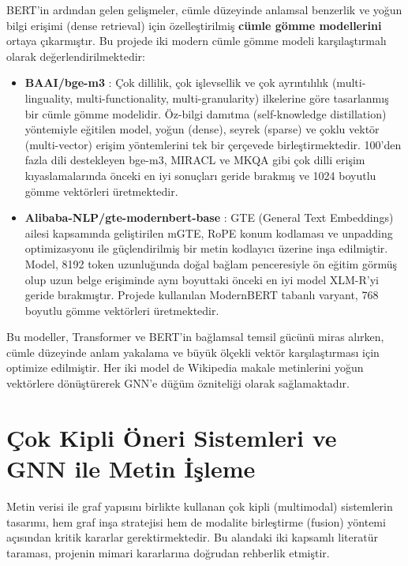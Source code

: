 BERT'in ardından gelen gelişmeler, cümle düzeyinde anlamsal benzerlik ve yoğun bilgi erişimi (dense retrieval) için özelleştirilmiş \textbf{cümle gömme modellerini} ortaya çıkarmıştır. Bu projede iki modern cümle gömme modeli karşılaştırmalı olarak değerlendirilmektedir:
\begin{itemize}
    \item \textbf{BAAI/bge-m3} \cite{chen2025bgem3}: Çok dillilik, çok işlevsellik ve çok ayrıntılılık (multi-linguality, multi-functionality, multi-granularity) ilkelerine göre tasarlanmış bir cümle gömme modelidir. Öz-bilgi damıtma (self-knowledge distillation) yöntemiyle eğitilen model, yoğun (dense), seyrek (sparse) ve çoklu vektör (multi-vector) erişim yöntemlerini tek bir çerçevede birleştirmektedir. 100'den fazla dili destekleyen bge-m3, MIRACL ve MKQA gibi çok dilli erişim kıyaslamalarında önceki en iyi sonuçları geride bırakmış ve 1024 boyutlu gömme vektörleri üretmektedir.
    \item \textbf{Alibaba-NLP/gte-modernbert-base} \cite{zhang2024mgte}: GTE (General Text Embeddings) ailesi kapsamında geliştirilen mGTE, RoPE konum kodlaması ve unpadding optimizasyonu ile güçlendirilmiş bir metin kodlayıcı üzerine inşa edilmiştir. Model, 8192 token uzunluğunda doğal bağlam penceresiyle ön eğitim görmüş olup uzun belge erişiminde aynı boyuttaki önceki en iyi model XLM-R'yi geride bırakmıştır. Projede kullanılan ModernBERT tabanlı varyant, 768 boyutlu gömme vektörleri üretmektedir.
\end{itemize}
Bu modeller, Transformer ve BERT'in bağlamsal temsil gücünü miras alırken, cümle düzeyinde anlam yakalama ve büyük ölçekli vektör karşılaştırması için optimize edilmiştir. Her iki model de Wikipedia makale metinlerini yoğun vektörlere dönüştürerek GNN'e düğüm özniteliği olarak sağlamaktadır.

\section{Çok Kipli Öneri Sistemleri ve GNN ile Metin İşleme}

Metin verisi ile graf yapısını birlikte kullanan çok kipli (multimodal) sistemlerin tasarımı, hem graf inşa stratejisi hem de modalite birleştirme (fusion) yöntemi açısından kritik kararlar gerektirmektedir. Bu alandaki iki kapsamlı literatür taraması, projenin mimari kararlarına doğrudan rehberlik etmiştir.

